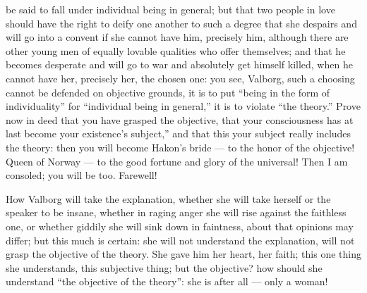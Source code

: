 \documentclass[12pt,a4paper,openany]{book}
\newcommand{\opage}[1]{\marginnote{\footnotesize\textit{[#1]}}}
\begin{document}
be said to fall under individual being in general;
but that two people in love should have the right to deify
one another to such a degree that she despairs and will go
into a convent if she cannot have him, precisely him,
although there are other young men of equally lovable
qualities who offer themselves; and that he becomes desperate
and will go to war and absolutely get himself killed, when he cannot
have her, precisely her, the chosen one: you see, Valborg,
such a choosing cannot be defended on objective
grounds, it is to put ``being in the form of individuality''
for ``individual being in general,'' it is
to violate ``the theory.'' Prove now in deed that you have
grasped the objective, that your consciousness has at last
become your existence's subject,'' and that this your subject
really includes the theory: then you will become Hakon's bride
--- to the honor of the objective! Queen of Norway --- to
the good fortune and glory of the universal! Then I am consoled;
you will be too. Farewell!

\setcounter{footnote}{0}%
\opage{592}How Valborg will take the explanation, whether she
will take herself or the speaker to be insane, whether
in raging anger she will rise against the faithless one, or
whether giddily she will sink down in faintness, about that
opinions may differ; but this much is certain: she
will not understand the explanation, will not grasp the objective of the theory.
She gave him her heart, her faith; this one thing she understands,
this subjective thing; but the objective? how
should she understand ``the objective of the theory'': she is after all
--- only a woman!
\end{document}
